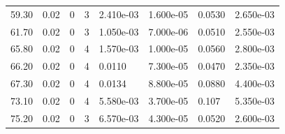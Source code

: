 \documentclass[preview]{standalone}
\begin{document}
{{\begin{tabular}{L{1.2cm}C{1.2cm} C{0.3cm}C{0.5cm} C{1.4cm}C{1.4cm} C{1.4cm}C{1.4cm}}
  59.30  &  0.02  & 0     &  3 &  2.410e-03  & 1.600e-05  & 0.0530 &  2.650e-03   \\ 
  61.70  &  0.02  & 0     &  3 &  1.050e-03  & 7.000e-06  & 0.0510 &  2.550e-03   \\ 
  65.80  &  0.02  & 0     &  4 &  1.570e-03  & 1.000e-05  & 0.0560 &  2.800e-03   \\ 
  66.20  &  0.02  & 0     &  4 &  0.0110  & 7.300e-05  & 0.0470 &  2.350e-03   \\ 
  67.30  &  0.02  & 0     &  4 &  0.0134  & 8.800e-05  & 0.0880 &  4.400e-03   \\ 
  73.10  &  0.02  & 0     &  4 &  5.580e-03  & 3.700e-05  & 0.107 &  5.350e-03   \\ 
  75.20  &  0.02  & 0     &  3 &  6.570e-03  & 4.300e-05  & 0.0520 &  2.600e-03   \\ 
\hline 
\end{tabular} 

}}
\end{document}
